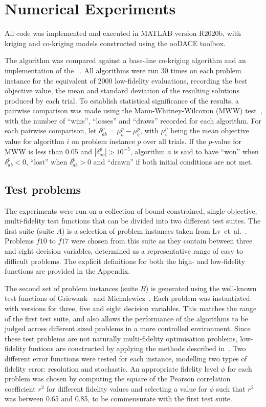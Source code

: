 \section{Numerical Experiments}\label{sec:exp}
All code was implemented and executed in MATLAB version R2020b, with kriging and co-kriging models constructed using the ooDACE toolbox.

The \AlgName{} algorithm was compared against a base-line co-kriging algorithm and an implementation of the \motos{}~\cite{xu2016mo2tos}. All algorithms were run 30 times on each problem instance for the equivalent of 2000 low-fidelity evaluations, recording the best objective value, the mean and standard deviation of the resulting solutions produced by each trial. To establish statistical significance of the results, a pairwise comparison was made using the Mann-Whitney-Wilcoxon (MWW) test~\cite{mann1947test}, with the number of ``wins'', ``losses'' and ``draws'' recorded for each algorithm. For each pairwise comparison, let $\delta^p_{ab} = \mu^p_a - \mu^p_b$, with $\mu^p_i$ being the mean objective value for algorithm $i$ on problem instance $p$ over all trials. If the $p$-value for MWW is less than 0.05 and $|\delta^p_{ab}| > 10^{-5}$, algorithm $a$ is said to have ``won'' when $\delta^p_{ab} < 0$, ``lost'' when $\delta^p_{ab} > 0$ and ``drawn'' if both initial conditions are not met.

\subsection{Test problems}
The experiments were run on a collection of bound-constrained, single-objective, multi-fidelity test functions that can be divided into two different test suites. The first suite (suite $A$) is a selection of problem instances taken from Lv~et~al.~\cite{lv2021multi}. Problems $f10$ to $f17$ were chosen from this suite as they contain between three and eight decision variables, determined as a representative range of easy to difficult problems. The explicit definitions for both the high- and low-fidelity functions are provided in the Appendix.

The second set of problem instances (suite $B$) is generated using the well-known test functions of Griewank~\cite{griewank1981generalized} and Michalewicz~\cite{michalewicz2013genetic}. Each problem was instantiated with versions for three, five and eight decision variables. This matches the range of the first test suite, and also allows the performance of the algorithms to be judged across different sized problems in a more controlled environment. Since these test problems are not naturally multi-fidelity optimisation problems, low-fidelity funtions are constructed by applying the methods described in~\cite{wang2017generic}. Two different error functions were tested for each instance, modelling two types of fidelity error: resolution and stochastic. An appropriate fidelity level $\phi$ for each problem was chosen by computing the square of the Pearson correlation coefficient $r^2$ for different fidelity values and selecting a value for $\phi$ such that $r^2$ was between 0.65 and 0.85, to be commensurate with the first test suite.

